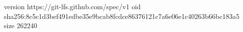 version https://git-lfs.github.com/spec/v1
oid sha256:8c5c1d3bef491edbe35e9bcab8fcdce86376121c7a6e06e1c40263b66bc183a5
size 262240
